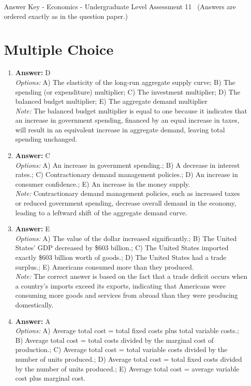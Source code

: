 \documentclass[12pt]{article}
\begin{document}
\begin{center}
Answer Key - Economics - Undergraduate Level Assessment 11 \
\small (Answers are ordered exactly as in the question paper.)
\end{center}

\section*{Multiple Choice}
\begin{enumerate}[label=\arabic*.]
\item \textbf{Answer:} D
\\ \textit{Options:} A) The elasticity of the long-run aggregate supply curve; B) The spending (or expenditure) multiplier; C) The investment multiplier; D) The balanced budget multiplier; E) The aggregate demand multiplier
\\ \textit{Note:} The balanced budget multiplier is equal to one because it indicates that an increase in government spending, financed by an equal increase in taxes, will result in an equivalent increase in aggregate demand, leaving total spending unchanged.
\item \textbf{Answer:} C
\\ \textit{Options:} A) An increase in government spending.; B) A decrease in interest rates.; C) Contractionary demand management policies.; D) An increase in consumer confidence.; E) An increase in the money supply.
\\ \textit{Note:} Contractionary demand management policies, such as increased taxes or reduced government spending, decrease overall demand in the economy, leading to a leftward shift of the aggregate demand curve.
\item \textbf{Answer:} E
\\ \textit{Options:} A) The value of the dollar increased significantly.; B) The United States' GDP decreased by \$603 billion.; C) The United States imported exactly \$603 billion worth of goods.; D) The United States had a trade surplus.; E) Americans consumed more than they produced.
\\ \textit{Note:} The correct answer is based on the fact that a trade deficit occurs when a country's imports exceed its exports, indicating that Americans were consuming more goods and services from abroad than they were producing domestically.
\item \textbf{Answer:} A
\\ \textit{Options:} A) Average total cost = total fixed costs plus total variable costs.; B) Average total cost = total costs divided by the marginal cost of production.; C) Average total cost = total variable costs divided by the number of units produced.; D) Average total cost = total fixed costs divided by the number of units produced.; E) Average total cost = average variable cost plus marginal cost.

\end{enumerate}
\end{document}
